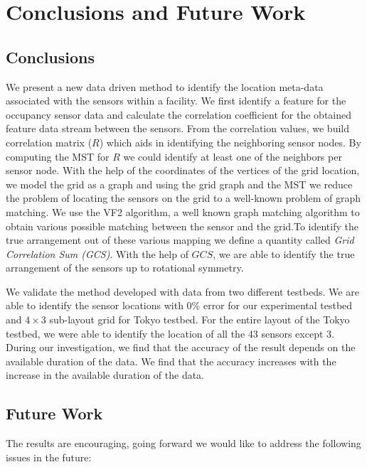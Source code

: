 \chapter{Conclusions and Future Work}
\label{chp:conclusionsandfuturework}

\section{Conclusions}

We present a new data driven method to identify the location meta-data associated with the sensors within a facility. 
We first identify a feature for the occupancy sensor data and calculate the correlation coefficient for the obtained feature data stream between the sensors.
 From the correlation values, we build correlation matrix ($R$)  which aids in identifying the neighboring sensor nodes.
By computing the MST for $R$ we could identify at least one of the neighbors per sensor node.
With the help of the coordinates of the vertices of the grid location, we model the grid as a graph and using the grid graph and the MST we reduce the problem of locating the sensors on the grid to a well-known problem of graph matching.
We use the VF2 algorithm, a well known graph matching algorithm to obtain various possible matching between the sensor and the grid.To identify the true arrangement out of these various mapping we define a quantity called \textit{Grid Correlation Sum (GCS)}.
With the help of $GCS$, we are able to identify the true arrangement of the sensors up to rotational symmetry. 

We validate the method developed with data from two different testbeds. We are able to identify the sensor locations with 0\% error for our experimental testbed and $4\times3$ sub-layout grid for Tokyo testbed.
For the entire layout of the Tokyo testbed, we were able to identify the location of all the 43 sensors except 3.
 During our investigation, we find that the accuracy of the result depends on the available duration of the data.
We find that the accuracy increases with the increase in the available duration of the data.


\section{Future Work}
The results are encouraging, going forward we would like to address the following issues in the future:

